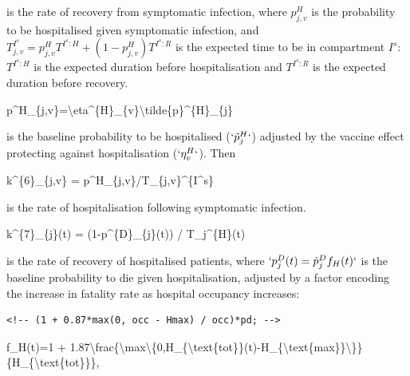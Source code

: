 \documentclass[
]{article}
\newenvironment{Shaded}{\begin{snugshade}}{\end{snugshade}}
\newcommand{\NormalTok}[1]{#1}
\begin{document}
is the rate of recovery from symptomatic infection, where \(p^H_{j,v}\) is the probability to be hospitalised given symptomatic infection, and \(T_{j,v}^{I^s} = p^H_{j,v}T^{I^s:H} + (1-p^H_{j,v})T^{I^s:R}\) is the expected time to be in compartment \(I^s\): \(T^{I^s:H}\) is the expected duration before hospitalisation and \(T^{I^s:R}\) is the expected duration before recovery.

\begin{Shaded}
\begin{Highlighting}[]
\NormalTok{p\^{}H\_\{j,v\}=\textbackslash{}eta\^{}\{H\}\_\{v\}\textbackslash{}tilde\{p\}\^{}\{H\}\_\{j\}}
\end{Highlighting}
\end{Shaded}

is the baseline probability to be hospitalised (\(`\tilde{p}^{H}_{j}`\)) adjusted by the vaccine effect protecting against hospitalisation (\(`\eta^{H}_{v}`\)). Then

\begin{Shaded}
\begin{Highlighting}[]
\NormalTok{k\^{}\{6\}\_\{j,v\} = p\^{}H\_\{j,v\}/T\_\{j,v\}\^{}\{I\^{}s\}}
\end{Highlighting}
\end{Shaded}

is the rate of hospitalisation following symptomatic infection.

\begin{Shaded}
\begin{Highlighting}[]
\NormalTok{k\^{}\{7\}\_\{j\}(t) = (1{-}p\^{}\{D\}\_\{j\}(t)) / T\_j\^{}\{H\}(t)}
\end{Highlighting}
\end{Shaded}

is the rate of recovery of hospitalised patients, where \(`p^{D}_{j}(t)=\tilde{p}^{D}_{j}f_H(t)`\) is the baseline probability to die given hospitalisation, adjusted by a factor encoding the increase in fatality rate as hospital occupancy increases:

\begin{verbatim}
<!-- (1 + 0.87*max(0, occ - Hmax) / occ)*pd; -->
\end{verbatim}

\begin{Shaded}
\begin{Highlighting}[]
\NormalTok{f\_H(t)=1 + 1.87\textbackslash{}frac\{\textbackslash{}max\textbackslash{}\{0,H\_\{\textbackslash{}text\{tot\}\}(t){-}H\_\{\textbackslash{}text\{max\}\}\textbackslash{}\}\}\{H\_\{\textbackslash{}text\{tot\}\}\},}
\end{Highlighting}
\end{Shaded}
\end{document}
